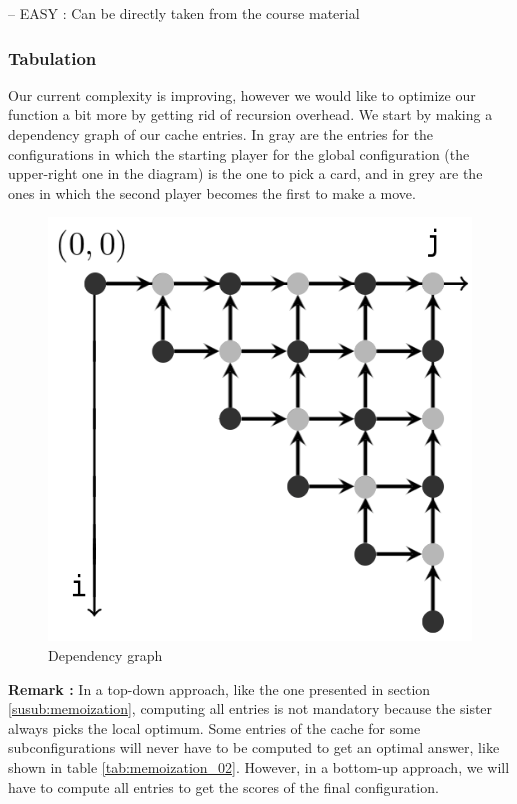 \documentclass[a4paper,12pt,fleqn]{article}
\begin{document}
-- EASY : Can be directly taken from the course material

\subsubsection{Tabulation}

Our current complexity is improving, however we would like to optimize our function a bit more by getting rid of recursion overhead.
We start by making a dependency graph of our cache entries. In gray are the entries for the configurations in which the starting player for the global configuration (the upper-right one in the diagram) is the one to pick a card, and in grey are the ones in which the second player becomes the first to make a move.

\begin{figure}[H]
    \centering
    \includegraphics[scale=0.5]{tabulation_01.png}

    \caption{Dependency graph}
    \label{fig:tabulation_01}
\end{figure}

\textbf{Remark :} In a top-down approach, like the one presented in section \ref{susub:memoization}, computing all entries is not mandatory because the sister always picks the local optimum. Some entries of the cache for some subconfigurations will never have to be computed to get an optimal answer, like shown in table \ref{tab:memoization_02}. However, in a bottom-up approach, we will have to compute all entries to get the scores of the final configuration.
\end{document}

